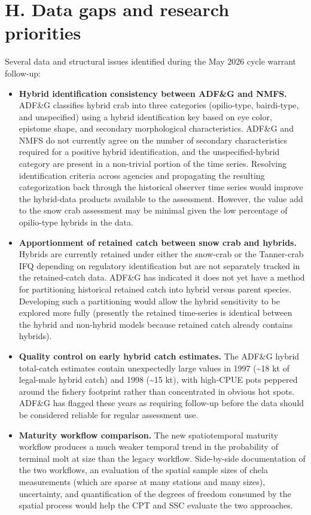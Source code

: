 \documentclass[
]{article}
\begin{document}
\section{H. Data gaps and research priorities}\label{h.-data-gaps-and-research-priorities}

Several data and structural issues identified during the May 2026 cycle warrant follow-up:

\begin{itemize}
\item
  \textbf{Hybrid identification consistency between ADF\&G and NMFS.} ADF\&G classifies hybrid crab into three categories (opilio-type, bairdi-type, and unspecified) using a hybrid identification key based on eye color, epistome shape, and secondary morphological characteristics. ADF\&G and NMFS do not currently agree on the number of secondary characteristics required for a positive hybrid identification, and the unspecified-hybrid category are present in a non-trivial portion of the time series. Resolving identification criteria across agencies and propagating the resulting categorization back through the historical observer time series would improve the hybrid-data products available to the assessment. However, the value add to the snow crab assessment may be minimal given the low percentage of opilio-type hybrids in the data.
\item
  \textbf{Apportionment of retained catch between snow crab and hybrids.} Hybrids are currently retained under either the snow-crab or the Tanner-crab IFQ depending on regulatory identification but are not separately tracked in the retained-catch data. ADF\&G has indicated it does not yet have a method for partitioning historical retained catch into hybrid versus parent species. Developing such a partitioning would allow the hybrid sensitivity to be explored more fully (presently the retained time-series is identical between the hybrid and non-hybrid models because retained catch already contains hybrids).
\item
  \textbf{Quality control on early hybrid catch estimates.} The ADF\&G hybrid total-catch estimates contain unexpectedly large values in 1997 (\textasciitilde18 kt of legal-male hybrid catch) and 1998 (\textasciitilde15 kt), with high-CPUE pots peppered around the fishery footprint rather than concentrated in obvious hot spots. ADF\&G has flagged these years as requiring follow-up before the data should be considered reliable for regular assessment use.
\item
  \textbf{Maturity workflow comparison.} The new spatiotemporal maturity workflow produces a much weaker temporal trend in the probability of terminal molt at size than the legacy workflow. Side-by-side documentation of the two workflows, an evaluation of the spatial sample sizes of chela measurements (which are sparse at many stations and many sizes), uncertainty, and quantification of the degrees of freedom consumed by the spatial process would help the CPT and SSC evaluate the two approaches.

\end{itemize}
\end{document}
